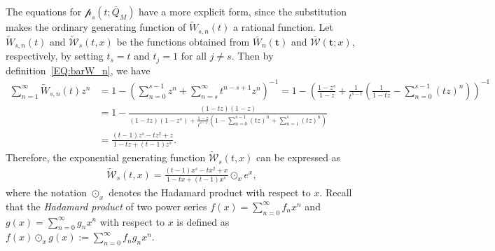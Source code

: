 \documentclass[11pt]{article}
\numberwithin{equation}{section}
\def\cW{\mathcal{W}}
\def\oQ{\overline{Q}}
\newcommand{\cp}{\mathcal{p}}
\begin{document}
The equations for $\cp_s(t;\oQ_M)$ have a more explicit form, since the substitution makes the ordinary generating function of $\tilde{W}_{s,n}(t)$ a rational function. Let $\tilde{W}_{s,n}(t)$ and $\tilde{\cW}_s(t,x)$ be the functions obtained from $\bar{W}_n(\mathbf{t})$ and $\bar{\mathcal{W}}(\mathbf{t};x)$, respectively, by setting $t_s=t$ and $t_j=1$ for all $j\neq s$. Then by definition~\eqref{EQ:barW_n}, we have
\begin{align}
\sum_{n=1}^{\infty} \tilde{W}_{s,n}(t) z^n
&=1- \left( \sum_{n=0}^{s-1}z^n + \sum_{n=s}^{\infty} t^{n-s+1} z^n \right)^{-1}
=1- \left( \frac{1-z^s}{1-z} + \frac{1}{t^{s-1}}\left(\frac{1}{1-tz}-\sum_{n=0}^{s-1}(tz)^n\right) \right)^{-1}\nonumber\\
&=1-\frac{(1-tz)(1-z)}{(1-tz)(1-z^s)+\frac{1-z}{t^{s-1}}\left(1-\sum_{n=0}^{s-1}(tz)^n+\sum_{n=1}^{s}(tz)^n\right)}
\nonumber\\
&=\frac{(t-1)z^s-tz^2+z}{1-tz+(t-1)z^s}.\label{EQ:barW-gf}
\end{align}
Therefore, the exponential generating function $\tilde{\cW}_{s}(t,x)$ can be expressed as 
\begin{align*}%
\tilde{\cW}_{s}(t,x)=\frac{(t-1)x^s-tx^2+x}{1-tx+(t-1)x^s}\odot_x e^x,
\end{align*}
where the notation $\odot_x$ denotes the Hadamard product with respect to $x$. Recall that the \textit{Hadamard product} of two power series $f(x)=\sum_{n=0}^{\infty}f_nx^n$ and $g(x)=\sum_{n=0}^{\infty}g_nx^n$ with respect to $x$ is defined as $f(x)\odot_x g(x):=\sum_{n=0}^{\infty}f_ng_nx^n$.
\end{document}
